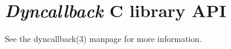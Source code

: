 %
%
%
%

\section{\emph{Dyncallback} C library API}

See the dyncallback(3) manpage for more information.

